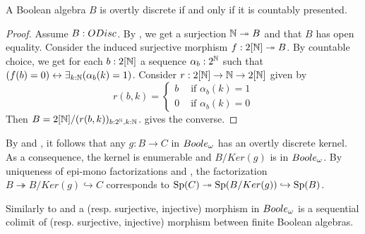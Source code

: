 \begin{corollary}\label{ODiscBAareBoole}
  A Boolean algebra $B$ is overtly discrete if and only if it is countably presented. 
\end{corollary}
\begin{proof}
  Assume $B:\ODisc$. 
  By , we get a surjection $\mathbb{N}\twoheadrightarrow B$ and that $B$ has open equality. 
  Consider the induced surjective morphism $f:2[\mathbb{N}]\twoheadrightarrow B$.
  By countable choice, we get for each $b:2[\mathbb{N}]$
  a sequence $\alpha_{b}:2^{\mathbb{N}}$ such that 
  $(f(b) = 0)\leftrightarrow \exists_{k:\mathbb{N}} (\alpha_{b}(k) =1)$. 
  Consider 
  $r:2[\mathbb{N}] \to \mathbb{N} \to 2[\mathbb{N}]$ 
  given by 
  \[r(b,k) =\begin{cases}
    b &\text{ if } \alpha_{b}(k) = 1\\
    0   &\text{ if } \alpha_{b}(k) = 0
  \end{cases}
  \] 
  Then $B= 2[\mathbb{N}]/(r(b,k))_{b:2^{\mathbb{N}},k:\mathbb{N}}$.
   gives the converse.
\end{proof}

\begin{remark}\label{BooleEpiMono}
  By  and , 
  it follows that any 
  $g:B\to C$ in $\Boole$ has an overtly discrete kernel.
  As a consequence, the kernel is enumerable and $B/Ker(g)$ is in $\Boole$. 
  By uniqueness of epi-mono factorizations and , 
  the factorization 
  $B\twoheadrightarrow B/Ker(g) \hookrightarrow C$ corresponds to 
  $\operatorname{Sp}(C) \twoheadrightarrow \operatorname{Sp}(B/Ker(g)) \hookrightarrow \operatorname{Sp}(B)$. 
\end{remark}
\begin{remark}\label{decompositionBooleMaps}
  Similarly to  and 
   a (resp. surjective, injective) morphism
  in $\Boole$ is a sequential colimit of (resp. surjective, injective) morphism between 
  finite Boolean algebras.
\end{remark}
